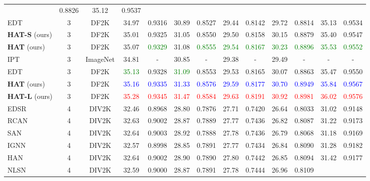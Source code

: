 \documentclass[10pt,twocolumn,letterpaper]{article}
\begin{document}
\begin{table*}[!ht]
\begin{center}
{\begin{tabular}{|l|c|c|c|c|c|c|c|c|c|c|c|c|}
& 0.8826
& 35.12
& 0.9537
\\
EDT & 3 & DF2K & 34.97
& 0.9316
& 30.89
& 0.8527
& 29.44
& 0.8142
& 29.72
& 0.8814
& 35.13
& 0.9534
\\
\textbf{HAT-S} (ours) & 3 & DF2K & {35.01}
& {0.9325}
& {31.05}
& {0.8550}
& {29.50}
& {0.8158}
& {30.15}
& {0.8879}
& {35.40}
& {0.9547}
\\
\textbf{HAT} (ours) & 3 & DF2K & {35.07}
& \textcolor{green}{0.9329}
& {31.08}
& \textcolor{green}{0.8555}
& \textcolor{green}{29.54}
& \textcolor{green}{0.8167}
& \textcolor{green}{30.23}
& \textcolor{green}{0.8896}
& \textcolor{green}{35.53}
& \textcolor{green}{0.9552}
\\
\hdashline
IPT & 3 & ImageNet & {34.81}
& {-}
& {30.85}
& {-}
& {29.38}
& {-}
& {29.49}
& {-}
& {-}
& {-}
\\
EDT & 3 & DF2K & \textcolor{green}{35.13}
& 0.9328
& \textcolor{green}{31.09}
& 0.8553
& {29.53}
& {0.8165}
& 30.07
& 0.8863
& 35.47
& 0.9550
\\
\textbf{HAT} (ours) & 3 & DF2K & \textcolor{blue}{35.16}
& \textcolor{blue}{0.9335}
& \textcolor{blue}{31.33}
& \textcolor{blue}{0.8576}
& \textcolor{blue}{29.59}
& \textcolor{blue}{0.8177}
& \textcolor{blue}{30.70}
& \textcolor{blue}{0.8949}
& \textcolor{blue}{35.84}
& \textcolor{blue}{0.9567}
\\
\textbf{HAT-L} (ours) & 3 & DF2K & \textcolor{red}{35.28}
& \textcolor{red}{0.9345}
& \textcolor{red}{31.47}
& \textcolor{red}{0.8584}
& \textcolor{red}{29.63}
& \textcolor{red}{0.8191}
& \textcolor{red}{30.92}
& \textcolor{red}{0.8981}
& \textcolor{red}{36.02}
& \textcolor{red}{0.9576}
\\
\hline
\hline
EDSR & 4 & DIV2K & 32.46
& 0.8968
& 28.80
& 0.7876
& 27.71
& 0.7420
& 26.64
& 0.8033
& 31.02
& 0.9148
\\
RCAN & 4 & DIV2K & 32.63
& 0.9002
& 28.87
& 0.7889
& 27.77
& 0.7436
& 26.82
& 0.8087
& 31.22
& 0.9173
\\
SAN & 4 & DIV2K & {32.64}
& {0.9003}
& {28.92}
& {0.7888}
& {27.78}
& {0.7436}
& {26.79}
& {0.8068}
& {31.18}
& {0.9169}
\\
IGNN & 4 & DIV2K & {32.57}
& {0.8998}
& {28.85}
& {0.7891}
& {27.77}
& {0.7434}
& {26.84}
& {0.8090}
& {31.28}
& {0.9182}
\\
HAN & 4 & DIV2K & {32.64}
& {0.9002}
& {28.90}
& {0.7890}
& {27.80}
& {0.7442}
& {26.85}
& {0.8094}
& {31.42}
& {0.9177}
\\
NLSN & 4 & DIV2K & 32.59 
& 0.9000 
& 28.87 
& 0.7891 
& 27.78 
& 0.7444 
& {26.96}
& {0.8109}

\end{tabular}}
\end{center}
\end{table*}
\end{document}
